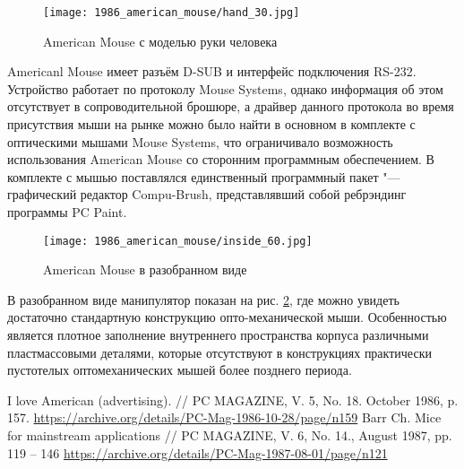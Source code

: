\documentclass[11pt, a4paper]{article}
\begin{document}
\begin{figure}[h]
    \centering
    \texttt{[image: 1986\_american\_mouse/hand\_30.jpg]}
    \caption{American Mouse с моделью руки человека}
    \label{fig:AmericanHand}
\end{figure}

Americanl Mouse имеет разъём D-SUB и интерфейс подключения RS-232. Устройство работает по протоколу Mouse Systems, однако информация об этом отсутствует в сопроводительной брошюре, а драйвер данного протокола во время присутствия мыши на рынке можно было найти в основном в комплекте с оптическими мышами Mouse Systems, что ограничивало возможность использования American Mouse со сторонним программным обеспечением. В комплекте с мышью поставлялся единственный программный пакет "--- графический редактор Compu-Brush, представлявший собой ребрэндинг программы PC Paint.

\begin{figure}[h]
    \centering
    \texttt{[image: 1986\_american\_mouse/inside\_60.jpg]}
    \caption{American Mouse в разобранном виде}
    \label{fig:AmericanInside}
\end{figure}

В разобранном виде манипулятор показан на рис. \ref{fig:AmericanInside}, где можно увидеть достаточно стандартную конструкцию опто-механической мыши. Особенностью является плотное заполнение внутреннего пространства корпуса различными пластмассовыми деталями, которые отсутствуют в конструкциях практически пустотелых оптомеханических мышей более позднего периода.

\begin{thebibliography}{9}
 I love American (advertising). // PC MAGAZINE, V. 5, No. 18. October 1986, p. 157. \url{https://archive.org/details/PC-Mag-1986-10-28/page/n159}
 Barr Ch. Mice for mainstream applications // PC MAGAZINE, V. 6, No. 14., August 1987, pp. 119 – 146 \url{https://archive.org/details/PC-Mag-1987-08-01/page/n121}
\end{thebibliography}
\end{document}
